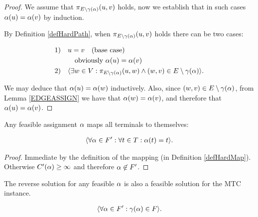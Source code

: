 \begin{proof}
We assume that $\pi_{E \setminus \gamma(\alpha)}(u, v)$ holds, now we establish that in such cases $\alpha(u) = \alpha(v)$ by induction.

By Definition \ref{defHardPath}, when $\pi_{E \setminus \gamma(\alpha)}(u, v)$ holds there can be two cases:

\begin{align}
	\nonumber \mbox{1)} \quad & u = v \quad \mbox{(base case)} \\
	\nonumber & \quad \mbox{obviously $\alpha(u) = \alpha(v)$} \\
	\nonumber \mbox{2)} \quad & \langle \exists w \in V: \pi_{E \setminus \gamma(\alpha)}(u, w) \wedge (w, v) \in E \setminus \gamma(\alpha) \rangle .
\end{align}

\noindent We may deduce that $\alpha(u) = \alpha(w)$ inductively.
Also, since $(w, v) \in E \setminus \gamma(\alpha)$, from Lemma \ref{EDGEASSIGN} we have that $\alpha(w) = \alpha(v)$, and therefore that $\alpha(u) = \alpha(v)$.
\end{proof}

\begin{lemma}
\label{FORCEASSIGN}
Any feasible assignment $\alpha$ maps all terminals to themselves:

\begin{align}
	\nonumber \langle \forall \alpha \in F' : \forall t \in T : \alpha(t) = t \rangle .
\end{align}
\end{lemma}

\begin{proof}
Immediate by the definition of the mapping (in Definition \ref{defHardMap}).
Otherwise $C'(\alpha) \geq \infty$ and therefore $\alpha \not\in F'$.
\end{proof}

\begin{lemma}
\label{REVERSEFEASABLE}
The reverse solution for any feasible $\alpha$ is also a feasible solution for the MTC instance.

\begin{align}
	\nonumber \langle \forall \alpha \in F' : \gamma(\alpha) \in F \rangle .
\end{align}
\end{lemma}

